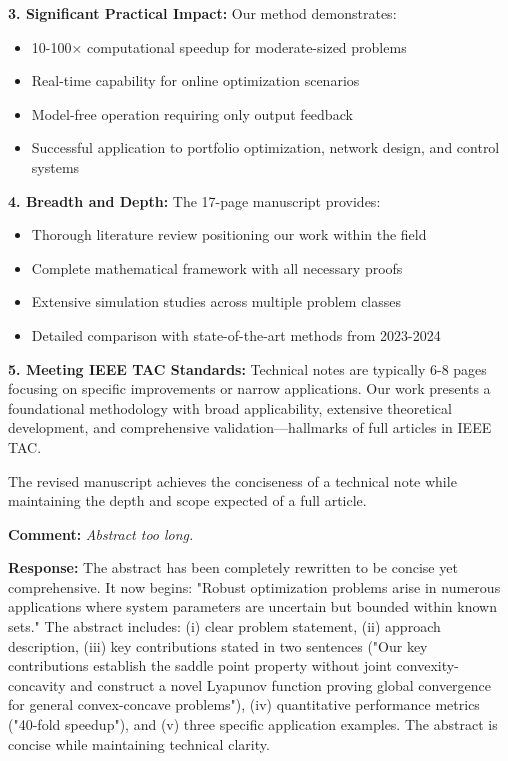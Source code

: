 \documentclass[journal,twoside,web]{ieeecolor}
\begin{document}
\textbf{3. Significant Practical Impact:} Our method demonstrates:
\begin{itemize}
\item 10-100× computational speedup for moderate-sized problems
\item Real-time capability for online optimization scenarios
\item Model-free operation requiring only output feedback
\item Successful application to portfolio optimization, network design, and control systems
\end{itemize}

\textbf{4. Breadth and Depth:} The 17-page manuscript provides:
\begin{itemize}
\item Thorough literature review positioning our work within the field
\item Complete mathematical framework with all necessary proofs
\item Extensive simulation studies across multiple problem classes
\item Detailed comparison with state-of-the-art methods from 2023-2024
\end{itemize}

\textbf{5. Meeting IEEE TAC Standards:} Technical notes are typically 6-8 pages focusing on specific improvements or narrow applications. Our work presents a foundational methodology with broad applicability, extensive theoretical development, and comprehensive validation—hallmarks of full articles in IEEE TAC.

The revised manuscript achieves the conciseness of a technical note while maintaining the depth and scope expected of a full article.

\textbf{Comment:} \textit{Abstract too long.}

\textbf{Response:} The abstract has been completely rewritten to be concise yet comprehensive. It now begins: "Robust optimization problems arise in numerous applications where system parameters are uncertain but bounded within known sets." The abstract includes: (i) clear problem statement, (ii) approach description, (iii) key contributions stated in two sentences ("Our key contributions establish the saddle point property without joint convexity-concavity and construct a novel Lyapunov function proving global convergence for general convex-concave problems"), (iv) quantitative performance metrics ("40-fold speedup"), and (v) three specific application examples. The abstract is concise while maintaining technical clarity.
\end{document}
